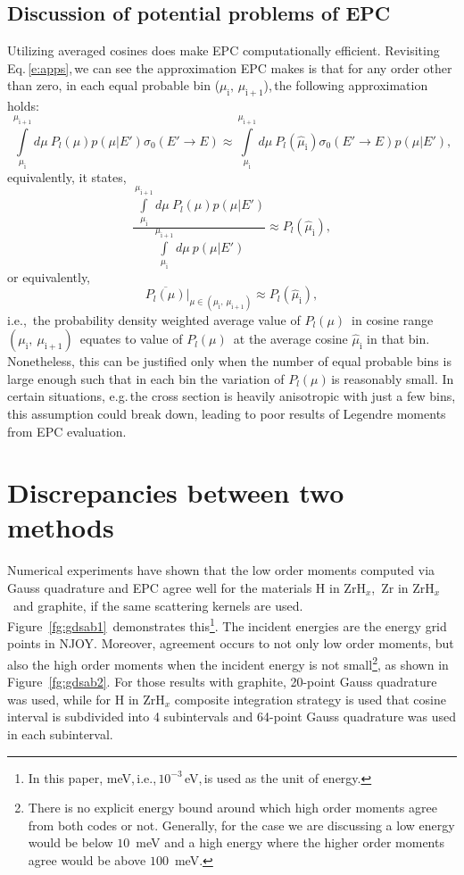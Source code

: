 \documentclass[review]{elsarticle}
\newcommand{\zh}{ZrH$_x$}
\begin{document}
\subsection{Discussion of potential problems of EPC}\label{sec:epcprob}
Utilizing averaged cosines does make EPC computationally efficient. Revisiting Eq.\,\eqref{e:apps},\,we can see the approximation EPC makes is that for any order other than zero, in each equal probable bin ($\mu_\mathrm{i},\,\mu_\mathrm{i+1}$),\,the following approximation holds:
	\begin{equation}
	\int\limits_{\mu_\mathrm{i}}^{\mu_\mathrm{i+1}}d\mu\ P_l(\mu)p(\mu|E')\sigma_0(E'\to E)\approx\int\limits_{\mu_\mathrm{i}}^{\mu_\mathrm{i+1}}d\mu\ P_l(\hat{\mu}_\mathrm{i})\sigma_0(E'\to E)p(\mu|E'),
	\end{equation}
	equivalently, it states,
	\begin{equation}\label{e:epsf}
	\frac{\displaystyle\int\limits_{\mu_\mathrm{i}}^{\mu_\mathrm{i+1}}d\mu\ P_l(\mu)p(\mu|E')}{\displaystyle\int\limits_{\mu_\mathrm{i}}^{\mu_\mathrm{i+1}}d\mu\ p(\mu|E')}\approx P_l(\hat{\mu}_\mathrm{i}),
	\end{equation}
	or equivalently,
	\begin{equation}\label{e:epsfbar}
	\overline{P_l(\mu)}|_{\mu\in(\mu_\mathrm{i},\,\mu_\mathrm{i+1})}\approx P_l(\hat{\mu}_\mathrm{i}),
	\end{equation}
	i.e.,\ the probability density weighted average value of $P_l(\mu)$\ in cosine range $(\mu_\mathrm{i},\ \mu_\mathrm{i+1})$\ equates to value of $P_l(\mu)$\ at the average cosine $\hat{\mu}_\mathrm{i}$ in that bin.
	Nonetheless, this can be justified only when the number of equal probable bins is large enough such that in each bin the variation of $P_l(\mu)$\,is reasonably small. In certain situations, e.g.\,the cross section is heavily anisotropic with just a few bins, this assumption could break down, leading to poor results of Legendre moments from EPC evaluation.


\section{Discrepancies between two methods}\label{s4}
Numerical experiments have shown that the low order moments computed via Gauss quadrature and EPC agree well for the materials H in \zh,~Zr in \zh~and graphite, if the same scattering kernels are used. Figure~\ref{fg:gdsab1}~demonstrates this\footnote{ In this paper, meV,\,i.e.,\,$10^{-3}$\,eV,\,is used as the unit of energy.}. The incident energies are the energy grid points in NJOY. Moreover, agreement occurs to not only low order moments, but also the high order moments when the incident energy is not small\footnote{There is no explicit energy bound around which high order moments agree from both codes or not. Generally, for the case we are discussing a low energy would be  below $10$~meV and a high energy where the higher order moments agree would be above $100$~meV.}, as shown in Figure~\ref{fg:gdsab2}. For those results with graphite, 20-point Gauss quadrature was used, while for H in ZrH$_x$ composite integration strategy is used that cosine interval is subdivided into 4 subintervals and 64-point Gauss quadrature was used in each subinterval.
\end{document}
